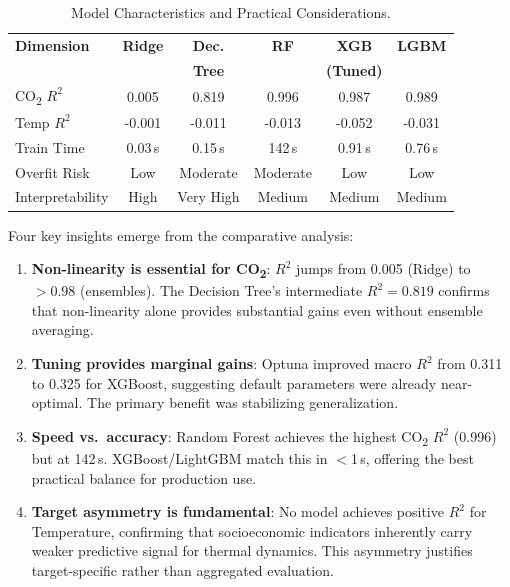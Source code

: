 \documentclass[conference]{IEEEtran}
\begin{document}
\begin{table}[htbp]
    \caption{Model Characteristics and Practical Considerations.}
    \label{tab:model_comparison}
    \centering
    \scriptsize
    \setlength{\tabcolsep}{3pt}
    \begin{tabular}{lccccc}
        \toprule
        \textbf{Dimension} & \textbf{Ridge} & \textbf{Dec.} & \textbf{RF} & \textbf{XGB} & \textbf{LGBM} \\
        & & \textbf{Tree} & & \textbf{(Tuned)} & \\
        \midrule
        CO\textsubscript{2} $R^2$ & 0.005 & 0.819 & 0.996 & 0.987 & 0.989 \\
        Temp $R^2$ & -0.001 & -0.011 & -0.013 & -0.052 & -0.031 \\
        Train Time & 0.03\,s & 0.15\,s & 142\,s & 0.91\,s & 0.76\,s \\
        Overfit Risk & Low & Moderate & Moderate & Low & Low \\
        Interpretability & High & Very High & Medium & Medium & Medium \\
        \bottomrule
    \end{tabular}
\end{table}

Four key insights emerge from the comparative analysis:
\begin{enumerate}
    \item \textbf{Non-linearity is essential for CO\textsubscript{2}}: $R^2$
    jumps from 0.005 (Ridge) to $>0.98$ (ensembles). The Decision Tree's
    intermediate $R^2 = 0.819$ confirms that non-linearity alone provides
    substantial gains even without ensemble averaging.
    \item \textbf{Tuning provides marginal gains}: Optuna improved macro $R^2$
    from 0.311 to 0.325 for XGBoost, suggesting default parameters were
    already near-optimal. The primary benefit was stabilizing generalization.
    \item \textbf{Speed vs.\ accuracy}: Random Forest achieves the highest
    CO\textsubscript{2} $R^2$ (0.996) but at 142\,s. XGBoost/LightGBM match
    this in $<$1\,s, offering the best practical balance for production use.
    \item \textbf{Target asymmetry is fundamental}: No model achieves positive
    $R^2$ for Temperature, confirming that socioeconomic indicators inherently
    carry weaker predictive signal for thermal dynamics. This asymmetry
    justifies target-specific rather than aggregated evaluation.
\end{enumerate}
\end{document}
